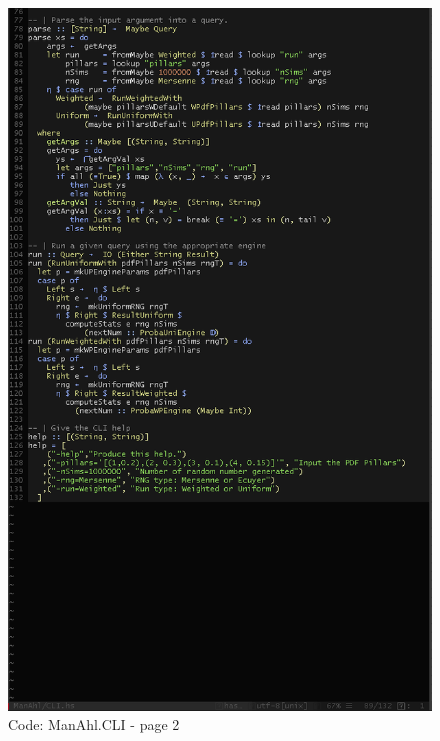 \documentclass[12pt,a4paper,article]{memoir} %
\begin{document}
\begin{figure}[h!]
\centering
\includegraphics[width=1\textwidth]{img/code-cli-2.png}
\caption{Code: ManAhl.CLI - page 2}
\label{fig:core.cli2}
\end{figure}
\end{document}

